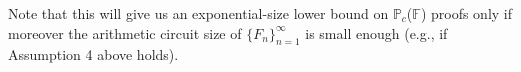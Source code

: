 \documentclass[12pt,reqno]{article}
\newcommand\F{\ensuremath{\mathbb F}}
\newcommand\PP{{\mathbb P}}
\newcommand\PC{\ensuremath{\PP_c}}
\newcommand{\matd}{{\ensuremath{{\rm Mat}_d(\F)}}}
\newcommand{\mattwo}{{\ensuremath{{\rm Mat}_2(\F)}}}
\begin{document}

Note that this will give us an exponential-size lower bound on \PC(\F) proofs only if moreover  the arithmetic circuit size of $\{F_n\}_{n=1}^\infty$ is small enough (e.g., if Assumption 4 above holds).


















%
\end{document}
